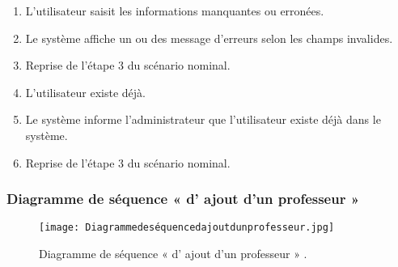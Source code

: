 \begin{itemize}
\begin{itemize}
\begin{enumerate}
			\item L’utilisateur saisit les informations manquantes ou erronées.
			\item Le système affiche un ou des message d’erreurs selon les champs invalides.
			\item Reprise de l’étape 3 du scénario nominal.
			\item L’utilisateur existe déjà.
			\item Le système informe l’administrateur que l’utilisateur existe déjà dans le système.
			\item Reprise de l’étape 3 du scénario nominal.
		\end{enumerate}
	\end{itemize}
\end{itemize}	
\bigskip
\subsubsection{Diagramme de séquence « d' ajout d'un professeur » }
\begin{figure}[ht]
	\centering
	\texttt{[image: Diagrammedeséquencedajoutdunprofesseur.jpg]}
	\caption{Diagramme de séquence « d' ajout d'un professeur »  .}
	\label{fig:Diagramme de séquence  d' ajout d'un professeur   }
\end{figure}
\FloatBarrier
{}



